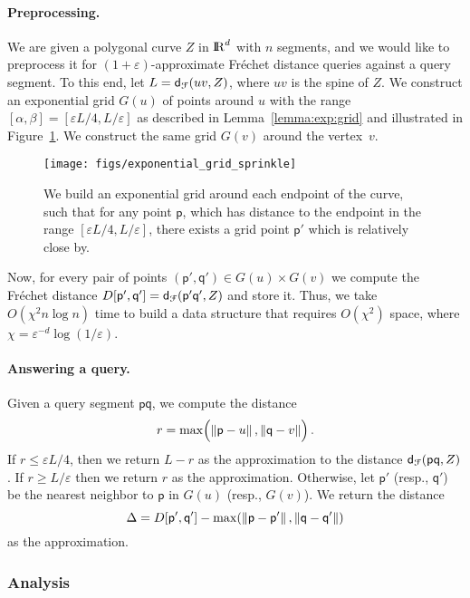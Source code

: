 \documentclass[12pt]{article}
\newcommand{\lemref}[1]{Lemma~\ref{lemma:#1}}
\newcommand{\figlab}[1]{\label{fig:#1}}
\newcommand{\figref}[1]{Figure~\ref{fig:#1}}
\newcommand{\Frechet}{Fr\'{e}c{h}e{}t\xspace}\providecommand{\Arr}{\mathop{\mathrm{\EuScript{A}}}}
\newcommand{\distFr}[2]{\mathsf{d}_{\EuScript{F}}\pth{#1, #2}}
\newcommand{\distX}[2]{\distCmd{#1 - #2}}
\newcommand{\pnt}{\mathsf{p}}
\newcommand{\pntA}{\mathsf{q}}
\newcommand{\cZ}{{Z}}
\providecommand{\pth}[2][\!]{#1\left({#2}\right)}
\providecommand{\MakeSBig}{\rule[0.0cm]{0.0cm}{0.35cm}}
\providecommand{\eps}{{\varepsilon}}\renewcommand{\Re}{{\rm I\!\hspace{-0.025em} R}}
\numberwithin{figure}{section}
\numberwithin{equation}{section}
\newcommand{\GridCompl}{\ensuremath{\chi}}
\newcommand{\NgridCompl}{\ensuremath{\eps^{-d}\log(1/\eps)}}
\newcommand{\gridMin}{\ensuremath{\eps L/4}}
\begin{document}
\paragraph{Preprocessing.}
We are given a polygonal curve $\cZ$ in $\Re^d$ with $n$ segments, and
we would like to preprocess it for $(1+\eps)$-approximate \Frechet
distance queries against a query segment. To this end, let $L =
\distFr{uv}{\cZ}$, where $uv$ is the spine of $\cZ$.  We construct an
exponential grid $G(u)$ of points around $u$ with the range 
$[\alpha,\beta]=[\gridMin,L/\eps]$ as described in \lemref{exp:grid}
 and illustrated in \figref{exp:sprinkle}.  
We construct the same grid $G(v)$ around the vertex~$v$.

\begin{figure}\centering
\texttt{[image: figs/exponential\_grid\_sprinkle]}
\caption{{We build an exponential grid around each endpoint of the curve, such that 
for any point $\pnt$, which has distance to the endpoint in the range
$[\gridMin, L/\eps]$, there exists a grid point $\pnt'$ which is relatively close by.}}
\figlab{exp:sprinkle}
\end{figure}

Now, for every pair of points $(\pnt',\pntA') \in G(u) \times G(v)$ we
compute the \Frechet distance $D[\pnt', \pntA'] = \distFr{\pnt'
\pntA'}{\cZ}$ and store it. Thus, we take 
$O\pth{ \GridCompl^2 n \log n }$ time to build a data structure 
that requires $O\pth{ \GridCompl^2 }$ space, where $\GridCompl=\NgridCompl$.

\paragraph{Answering a query.}
Given a query segment $\pnt \pntA$, we compute the distance
\begin{align*}
    r = \max\pth{ \!\MakeSBig \distX{\pnt}{u}, \distX{\pntA}{v}}.
\end{align*}
If $r \leq \gridMin$, then we return $L-r$ as the approximation
to the distance $\distFr{\pnt\pntA}{\cZ}$.  
If $r \geq L/\eps$ then we return $r$ as the approximation. 
Otherwise, let $\pnt'$ (resp., $\pntA'$) be the nearest neighbor to
$\pnt$ in $G(u)$ (resp., $G(v)$). We return the distance
\[
\Delta = D[\pnt', \pntA'] - \max\pth{\distX{\pnt}{\pnt'},
       \distX{\pntA}{\pntA'}}
      \]
as the approximation.

\subsubsection{Analysis}
\end{document}

